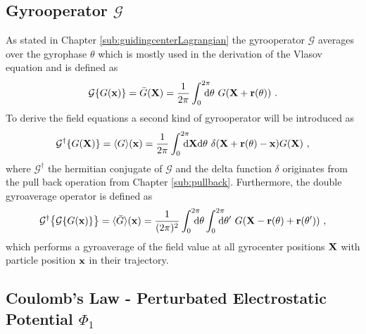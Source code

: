 
\subsection{Gyrooperator $\mathcal{G}$}
\label{sub:gyroOperator}

As stated in Chapter \ref{sub:guidingcenterLagrangian} the gyrooperator $\mathcal{G}$ averages over the gyrophase $\theta$ which is mostly used in the derivation of the Vlasov equation and is defined as
\begin{gather}
    \mathcal{G} \{G(\boldsymbol{\mathbf{x}})\} = \bar{G}(\boldsymbol{\mathbf{X}}) = \frac{1}{2\pi} \int_{0}^{2\pi} \!\!\!\!\! \mathrm{d}\theta ~ G(\boldsymbol{\mathbf{X}} + \boldsymbol{\mathbf{r}}(\theta))~.
    \label{eq:gyroOperatorRevision}
\end{gather}
To derive the field equations a second kind of gyrooperator will be introduced as
\begin{gather}
    \mathcal{G}^\dagger \{G(\boldsymbol{\mathbf{X}})\} = \langle G\rangle(\boldsymbol{\mathbf{x}}) = \frac{1}{2\pi} \int_{0}^{2\pi} \!\!\!\!\! \mathrm{d}\boldsymbol{\mathbf{X}}\mathrm{d}\theta ~ \delta(\boldsymbol{\mathbf{X}} + \boldsymbol{\mathbf{r}}(\theta) - \boldsymbol{\mathbf{x}}) G(\boldsymbol{\mathbf{X}})~,
    \label{eq:gyroOperatorDagger}
\end{gather}
where $\mathcal{G}^\dagger$ the hermitian conjugate of $\mathcal{G}$\cite{Told_PHD} and the delta function $\delta$ originates from the pull back operation from Chapter \ref{sub:pullback}.\cite{Merlo_PHD} Furthermore, the double gyroaverage operator is defined as
\begin{gather}
    \tgad{\bigl\{ \tga{\{G(\x)\}} \bigr\}} = \gad{\ga{G}}(\x) = \frac{1}{(2\pi)^2} \intss{0}{2\pi} \dtheta \intss{0}{2\pi} \dtheta' ~ G(\X - \rrho(\theta) + \rrho(\theta'))~,
    \label{eq:gyroOperatorDouble}
\end{gather}
which performs a gyroaverage of the field value at all gyrocenter positions $\boldsymbol{\mathbf{X}}$ with particle position $\boldsymbol{\mathbf{x}}$ in their trajectory. \cite{Maurer_PHD}
\newpage

\subsection{Coulomb's Law - Perturbated Electrostatic Potential $\Phi_1$}
\label{sub:fieldPotential}

